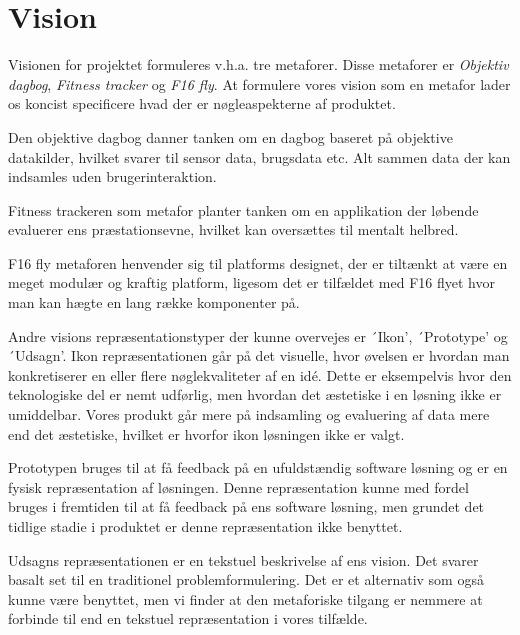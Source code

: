 \section{Vision}
Visionen for projektet formuleres v.h.a. tre metaforer.
Disse metaforer er \textit{Objektiv dagbog}, \textit{Fitness tracker} og \textit{F16 fly}.
At formulere vores vision som en metafor lader os koncist specificere hvad der er nøgleaspekterne af produktet.

Den objektive dagbog danner tanken om en dagbog baseret på objektive datakilder, hvilket svarer til sensor data, brugsdata etc.
Alt sammen data der kan indsamles uden brugerinteraktion.

Fitness trackeren som metafor planter tanken om en applikation der løbende evaluerer ens præstationsevne, hvilket kan oversættes til mentalt helbred.

F16 fly metaforen henvender sig til platforms designet, der er tiltænkt at være en meget modulær og kraftig platform, ligesom det er tilfældet med F16 flyet hvor man kan hægte en lang række komponenter på.

Andre visions repræsentationstyper der kunne overvejes er ´Ikon', ´Prototype' og ´Udsagn'.
Ikon repræsentationen går på det visuelle, hvor øvelsen er hvordan man konkretiserer en eller flere nøglekvaliteter af en idé.
Dette er eksempelvis hvor den teknologiske del er nemt udførlig, men hvordan det æstetiske i en løsning ikke er umiddelbar.
Vores produkt går mere på indsamling og evaluering af data mere end det æstetiske, hvilket er hvorfor ikon løsningen ikke er valgt.

Prototypen bruges til at få feedback på en ufuldstændig software løsning og er en fysisk repræsentation af løsningen.
Denne repræsentation kunne med fordel bruges i fremtiden til at få feedback på ens software løsning, men grundet det tidlige stadie i produktet er denne repræsentation ikke benyttet.

Udsagns repræsentationen er en tekstuel beskrivelse af ens vision. Det svarer basalt set til en traditionel problemformulering.
Det er et alternativ som også kunne være benyttet, men vi finder at den metaforiske tilgang er nemmere at forbinde til end en tekstuel repræsentation i vores tilfælde.
